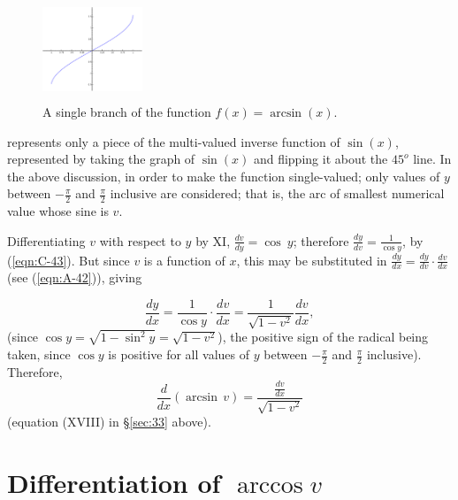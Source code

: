 \begin{figure}[h!]
\begin{minipage}{\textwidth}
\begin{center}
\includegraphics[height=3cm,width=3cm]{arcsin.eps}
\end{center}
\end{minipage}
\caption{A single branch of the function $f(x)=\arcsin(x)$.}
\label{fig:arcsin}
\end{figure}

\noindent
represents only a piece of the multi-valued inverse function of $\sin(x)$,
represented by taking the graph of $\sin(x)$ and flipping it about the 
$45^o$ line.
In the above discussion, in order to make the function single-valued; 
only values of $y$ between $-\frac{\pi}{2}$ and $\frac{\pi}{2}$ inclusive %
are considered; that is, the arc of smallest numerical value whose sine is $v$. 

Differentiating $v$ with respect to $y$ by XI, $\frac{dv}{dy} 	= \cos\ y$;
therefore $\frac{dy}{dv} = \frac{1}{\cos y}$, by (\ref{eqn:C-43}). %
But since $v$ is a function of $x$, this may be substituted in
$\frac{dy}{dx} 	= \frac{dy}{dv} \cdot \frac{dv}{dx}$ (see (\ref{eqn:A-42})),%
giving 	

\[
\frac{dy}{dx} 	= \frac{1}{\cos y} \cdot \frac{dv}{dx} 	= \frac{1}{\sqrt{1 - v^2}} \frac{dv}{dx},
\]
(since $\cos y = \sqrt{1 - \sin^2 y} = \sqrt{1 - v^2}$), the positive sign 
of the radical being taken, since $\cos y$ is positive for all values of 
$y$ between $-\frac{\pi}{2}$ and $\frac{\pi}{2}$ inclusive). Therefore,
\[
\frac{d}{dx}(\arcsin\, v) 	= \frac{\frac{dv}{dx}}{\sqrt{1 - v^2}}
\]
(equation (XVIII) in \S \ref{sec:33}  above).

\section{Differentiation of $\arccos v$}

